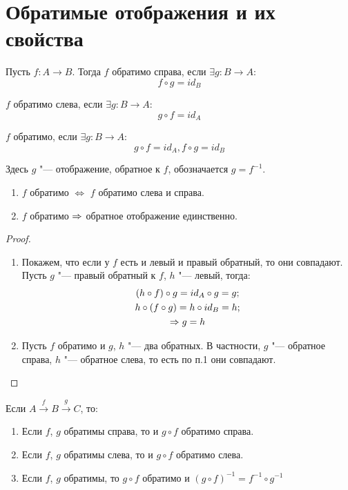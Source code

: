 ﻿\section{Обратимые отображения и их свойства}

\begin{Def}
Пусть $f: A \to B$. Тогда $f$ обратимо справа, если $\exists g: B \to A \colon$ \[f \circ g = id_B\]

$f$ обратимо слева, если $\exists g: B \to A \colon$ \[g \circ f = id_A\]

$f$ обратимо, если $\exists g: B \to A \colon$ \[g \circ f = id_A, f \circ g = id_B\]

Здесь $g$ "--- отображение, обратное к $f$, обозначается $g=f^{-1}$.
\end{Def}

\begin{theorem}{}

\begin{enumerate}
\item $f$ обратимо $\iff$ $f$ обратимо слева и справа.
\item $f$ обратимо $\Rightarrow$ обратное отображение единственно.
\end{enumerate}

\end{theorem}

\begin{proof}
\begin{enumerate}
\item
Покажем, что если у $f$ есть и левый и правый обратный, то они совпадают.
Пусть $g$ "--- правый обратный к $f$, $h$ "--- левый, тогда:
\begin{gather*}
(h \circ f) \circ g = id_A \circ g = g; \\
h \circ (f \circ g) = h \circ id_B = h; \\
\Rightarrow g = h\\
\end{gather*}

\item Пусть $f$ обратимо и $g$, $h$ "--- два обратных. В частности, $g$ "--- обратное справа, $h$ "--- обратное слева, то есть по п.1 они совпадают.
\end{enumerate}
\end{proof}

\begin{theorem}{}
Если $A \xrightarrow{f} B \xrightarrow{g} C$, то:

\begin{enumerate}
\item Если $f$, $g$ обратимы справа, то и $g \circ f$ обратимо справа.
\item Если $f$, $g$ обратимы слева, то и $g \circ f$ обратимо слева.
\item Если $f$, $g$ обратимы, то $g \circ f$ обратимо и $(g \circ f)^{-1} = f^{-1} \circ g^{-1}$
\end{enumerate}
\end{theorem}

